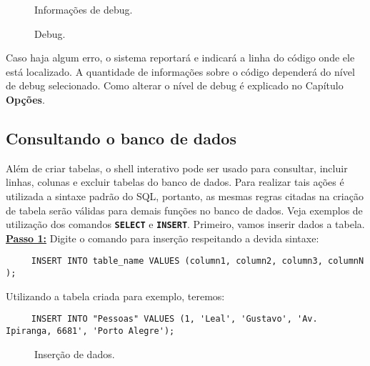\documentclass[9pt]{report}
\begin{document}
{    \begin{figure}[H]
      \caption{ Informações de debug.}
      \label{fig:infodebug}
    \end{figure}

    
    \begin{figure}[H]
      \caption{Debug.}
      \label{fig:Debug}
    \end{figure}

    Caso haja algum erro, o sistema reportará e indicará a linha
    do código onde ele está localizado. A quantidade de
    informações sobre o código dependerá do nível de debug
    selecionado. Como alterar o nível de debug é explicado
    no Capítulo \textbf{Opções}.

    \subsection{Consultando o banco de dados}

    Além de criar tabelas, o shell interativo pode ser usado
    para consultar, incluir linhas, colunas e excluir tabelas
    do banco de dados. Para realizar tais ações é utilizada a
    sintaxe padrão do SQL, portanto, as mesmas regras citadas
    na criação de tabela serão válidas para demais funções no
    banco de dados. Veja exemplos de utilização dos comandos
    \texttt{\textbf{SELECT}} e \texttt{\textbf{INSERT}}.
    Primeiro, vamos inserir dados a tabela.
     \\
    
    \underline{\textbf{Passo 1:}}  Digite o comando para inserção
    respeitando a devida sintaxe:

   \begin{lstlisting}
     INSERT INTO table_name VALUES (column1, column2, column3, columnN );
   \end{lstlisting}
   
   Utilizando a tabela criada para exemplo, teremos:
   
   \begin{lstlisting}
     INSERT INTO "Pessoas" VALUES (1, 'Leal', 'Gustavo', 'Av. Ipiranga, 6681', 'Porto Alegre');
   \end{lstlisting}

   \begin{figure}[H]
      \caption{Inserção de dados.}
      \label{fig:inserindoDados}
   \end{figure}

}
\end{document}
